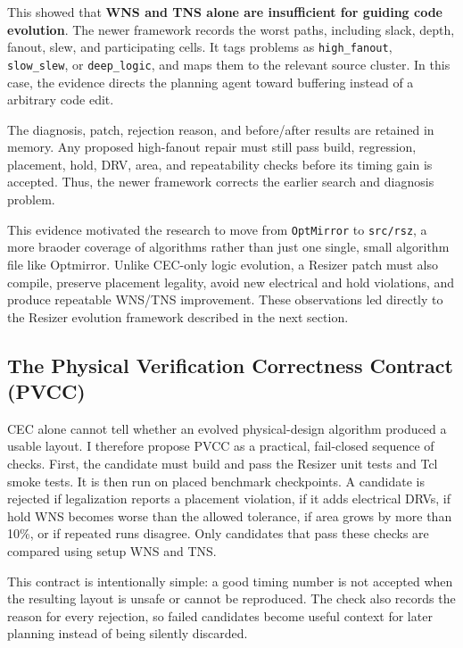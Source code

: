 \documentclass[10pt, conference]{IEEEtran}
\begin{document}
This showed that \textbf{WNS and TNS alone are insufficient for guiding code evolution}. The newer framework records the worst paths, including slack, depth, fanout, slew, and participating cells. It tags problems as \texttt{high\_fanout}, \texttt{slow\_slew}, or \texttt{deep\_logic}, and maps them to the relevant source cluster.  In this case, the evidence directs the planning agent toward buffering instead of a arbitrary code edit.

The diagnosis, patch, rejection reason, and before/after results are retained in memory. Any proposed high-fanout repair must still pass build, regression, placement, hold, DRV, area, and repeatability checks before its timing gain is accepted. Thus, the newer framework corrects the earlier search and diagnosis problem.

This evidence motivated the research to move from \texttt{OptMirror} to \texttt{src/rsz}, a more braoder coverage of algorithms rather than just one single, small algorithm file like Optmirror. Unlike CEC-only logic evolution, a Resizer patch must also compile, preserve placement legality, avoid new electrical and hold violations, and produce repeatable WNS/TNS improvement. These observations led directly to the Resizer evolution framework described in the next section.



\subsection{The Physical Verification Correctness Contract (PVCC)}

CEC alone cannot tell whether an evolved physical-design algorithm produced a usable layout. I therefore propose PVCC as a practical, fail-closed sequence of checks. First, the candidate must build and pass the Resizer unit tests and Tcl smoke tests. It is then run on placed benchmark checkpoints. A candidate is rejected if legalization reports a placement violation, if it adds electrical DRVs, if hold WNS becomes worse than the allowed tolerance, if area grows by more than 10\%, or if repeated runs disagree. Only candidates that pass these checks are compared using setup WNS and TNS.

This contract is intentionally simple: a good timing number is not accepted when the resulting layout is unsafe or cannot be reproduced. The check also records the reason for every rejection, so failed candidates become useful context for later planning instead of being silently discarded.
\end{document}
